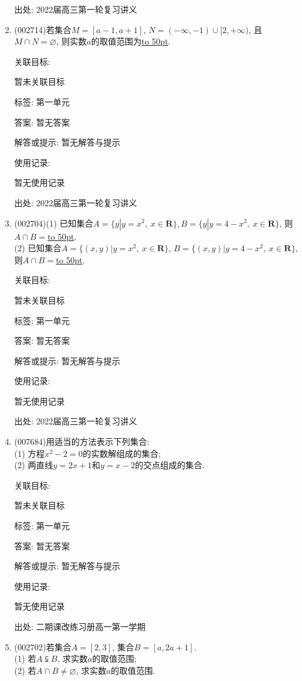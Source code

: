 \documentclass[10pt,a4paper]{article}
\newcommand{\blank}[1]{\underline{\hbox to #1pt{}}}
\begin{document}
\begin{enumerate}[1.]
出处: 2022届高三第一轮复习讲义
\item { (002714)}若集合$M=[a-1,a+1]$, $N=(-\infty,-1)\cup [2,+\infty)$, 且$M\cap N=\varnothing$, 则实数$a$的取值范围为\blank{50}.


关联目标:

暂未关联目标



标签: 第一单元

答案: 暂无答案

解答或提示: 暂无解答与提示

使用记录:

暂无使用记录


出处: 2022届高三第一轮复习讲义
\item { (002704)}(1) 已知集合$A=\{y|y=x^2, \ x\in \mathbf{R}\}, B=\{y|y=4-x^2, \ x\in \mathbf{R}\}$, 则$A\cap B=$\blank{50}.\\
(2) 已知集合$A=\{(x,y)|y={x^2},\ x\in \mathbf{R}\}$, $B=\{(x,y)|y=4-x^2, \ x\in \mathbf{R}\}$, 则$A\cap B=$\blank{50}.


关联目标:

暂未关联目标



标签: 第一单元

答案: 暂无答案

解答或提示: 暂无解答与提示

使用记录:

暂无使用记录


出处: 2022届高三第一轮复习讲义
\item { (007684)}用适当的方法表示下列集合:\\
(1) 方程$x^2-2=0$的实数解组成的集合;\\
(2) 两直线$y=2x+1$和$y=x-2$的交点组成的集合.


关联目标:

暂未关联目标



标签: 第一单元

答案: 暂无答案

解答或提示: 暂无解答与提示

使用记录:

暂无使用记录


出处: 二期课改练习册高一第一学期
\item { (002702)}若集合$A=[2,3]$, 集合$B=[a,2a+1]$.\\
(1) 若$A\subsetneqq B$, 求实数$a$的取值范围;\\
(2) 若$A\cap B\ne \varnothing$, 求实数$a$的取值范围.



\end{enumerate}
\end{document}
